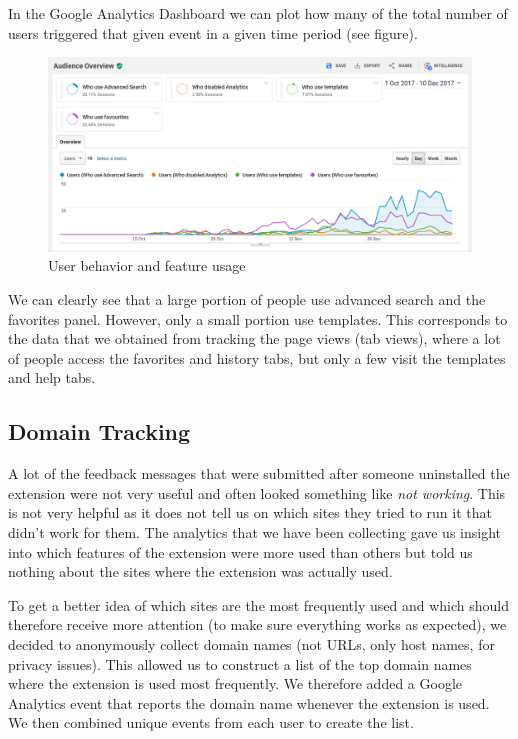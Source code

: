 \documentclass[bsc,frontabs,twoside,singlespacing,parskip,deptreport]{infthesis}
\begin{document}
In the Google Analytics Dashboard we can plot how many of the total number of users triggered that given event in a given time period (see figure).

\begin{figure}[h]
\centering
\includegraphics[width=1\textwidth]{../docs/user-behavior.png}
\caption{User behavior and feature usage}
\end{figure}

We can clearly see that a large portion of people use advanced search and the favorites panel. However, only a small portion use templates. This corresponds to the data that we obtained from tracking the page views (tab views), where a lot of people access the favorites and history tabs, but only a few visit the templates and help tabs.

\subsection{Domain Tracking}
A lot of the feedback messages that were submitted after someone uninstalled the extension were not very useful and often looked something like \textit{not working}. This is not very helpful as it does not tell us on which sites they tried to run it that didn't work for them. The analytics that we have been collecting gave us insight into which features of the extension were more used than others but told us nothing about the sites where the extension was actually used.

To get a better idea of which sites are the most frequently used and which should therefore receive more attention (to make sure everything works as expected), we decided to anonymously collect domain names (not URLs, only host names, for privacy issues). This allowed us to construct a list of the top domain names where the extension is used most frequently. We therefore added a Google Analytics event that reports the domain name whenever the extension is used. We then combined unique events from each user to create the list.
\end{document}
